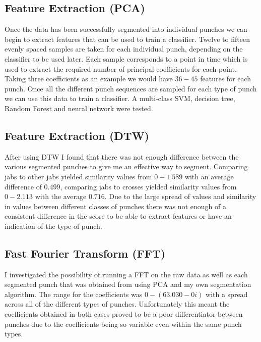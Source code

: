 \subsection{Feature Extraction (PCA)}
Once the data has been successfully segmented into individual punches we can begin to extract features that can be used to train a classifier. Twelve to fifteen evenly spaced samples are taken for each individual punch, depending on the classifier to be used later. Each sample corresponds to a point in time which is used to extract the required number of principal coefficients for each point. Taking three coefficients as an example we would have $36 - 45$ features for each punch.
Once all the different punch sequences are sampled for each type of punch we can use this data to train a classifier. A multi-class SVM, decision tree, Random Forest and neural network were tested.

\subsection{Feature Extraction (DTW)}
After using DTW I found that there was not enough difference between the various segmented punches to give me an effective way to segment. Comparing jabs to other jabs yielded similarity values from $0 - 1.589$ with an average difference of $0.499$, comparing jabs to crosses yielded similarity values from $0-2.113$ with the average $0.716$. Due to the large spread of values and similarity in values between different classes of punches there was not enough of a consistent difference in the score to be able to extract features or have an indication of the type of punch.

\subsection{Fast Fourier Transform (FFT)}
 I investigated the possibility of running a FFT on the raw data as well as each segmented punch that was obtained from using PCA and my own segmentation algorithm. The range for the coefficients was $0 - (63.030 - 0i)$ with a spread across all of the different types of punches. Unfortunately this meant the coefficients obtained in both cases proved to be a poor differentiator between punches due to the coefficients being so variable even within the same punch types.


